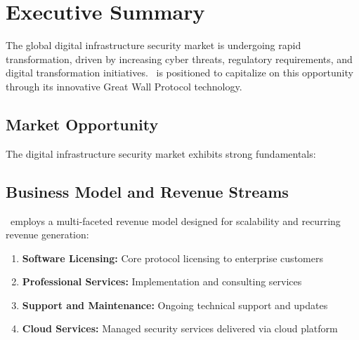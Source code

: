 \section{Executive Summary}\label{sec:executive-summary}


The global digital infrastructure security market is undergoing rapid transformation, driven by increasing cyber threats, regulatory requirements, and digital transformation initiatives. \companyname\ is positioned to capitalize on this opportunity through its innovative Great Wall Protocol technology.

\subsection{Market Opportunity}

The digital infrastructure security market exhibits strong fundamentals:



\subsection{Business Model and Revenue Streams}

\companyname\ employs a multi-faceted revenue model designed for scalability and recurring revenue generation:

\begin{enumerate}
    \item \textbf{Software Licensing:} Core protocol licensing to enterprise customers
    \item \textbf{Professional Services:} Implementation and consulting services
    \item \textbf{Support and Maintenance:} Ongoing technical support and updates
    \item \textbf{Cloud Services:} Managed security services delivered via cloud platform
\end{enumerate}


